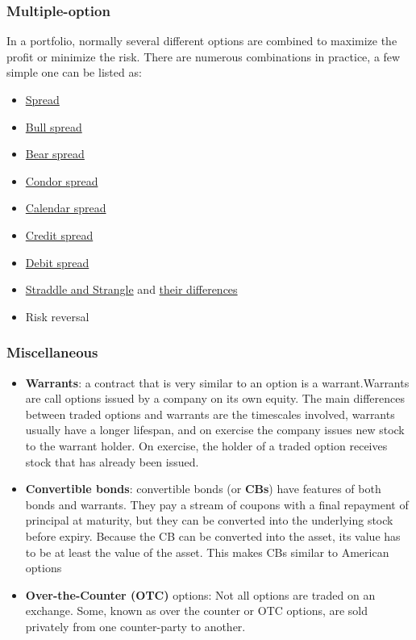 \subsubsection{Multiple-option}
In a portfolio, normally several different options are combined to maximize the profit or minimize the risk. There are numerous combinations in practice, a few simple one can be listed as:
\begin{itemize}
    \setlength\itemsep{0em}
    \item \href{https://www.investopedia.com/terms/s/spread.asp}{Spread}
    \item \href{https://www.investopedia.com/terms/b/bullspread.asp}{Bull spread}
    \item \href{https://www.investopedia.com/terms/b/bearspread.asp}{Bear spread}
    \item \href{https://www.investopedia.com/terms/c/condorspread.asp}{Condor spread}
    \item \href{https://www.investopedia.com/terms/c/calendarspread.asp}{Calendar spread}
    \item \href{https://www.investopedia.com/terms/c/creditspread.asp}{Credit spread}
    \item \href{https://www.investopedia.com/terms/d/debitspread.asp}{Debit spread}
    \item \href{https://brilliant.org/wiki/straddle-strangle/}{Straddle and Strangle} and \href{https://www.investopedia.com/ask/answers/05/052805.asp}{their differences}
    \item Risk reversal 
\end{itemize}


\subsubsection{Miscellaneous}
\begin{itemize}
    \setlength\itemsep{0em}
    \item \textbf{Warrants}: a contract that is very similar to an option is a warrant.Warrants are call options issued by a company on its own equity. The main differences between traded options and warrants are the timescales involved, warrants usually have a longer lifespan, and on exercise the company issues new stock to the warrant holder. On exercise, the holder of a traded option receives stock that has already been issued.
    \item \textbf{Convertible bonds}: convertible bonds (or \textbf{CBs}) have features of both bonds and warrants. They pay a stream of coupons with a final repayment of principal at maturity, but they can be converted into the underlying stock before expiry. Because the CB can be converted into the asset, its value has to be at least the value of the asset. This makes CBs similar to American options
    \item \textbf{Over-the-Counter (OTC)} options: Not all options are traded on an exchange. Some, known as over the counter or OTC options, are sold privately from one counter-party to another.
\end{itemize}



